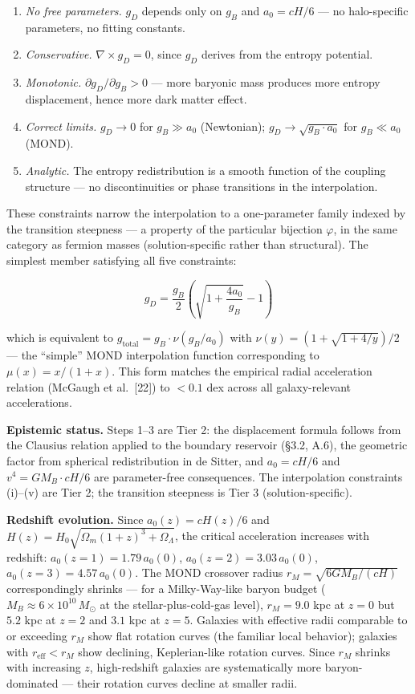 \documentclass[
]{article}
\begin{document}
\begin{enumerate}
\def\labelenumi{(\roman{enumi})}
\item
  \emph{No free parameters.} \(g_D\) depends only on \(g_B\) and
  \(a_0 = cH/6\) --- no halo-specific parameters, no fitting constants.
\item
  \emph{Conservative.} \(\nabla \times g_D = 0\), since \(g_D\) derives
  from the entropy potential.
\item
  \emph{Monotonic.} \(\partial g_D / \partial g_B > 0\) --- more
  baryonic mass produces more entropy displacement, hence more dark
  matter effect.
\item
  \emph{Correct limits.} \(g_D \to 0\) for \(g_B \gg a_0\) (Newtonian);
  \(g_D \to \sqrt{g_B \cdot a_0}\) for \(g_B \ll a_0\) (MOND).
\item
  \emph{Analytic.} The entropy redistribution is a smooth function of
  the coupling structure --- no discontinuities or phase transitions in
  the interpolation.
\end{enumerate}

These constraints narrow the interpolation to a one-parameter family
indexed by the transition steepness --- a property of the particular
bijection \(\varphi\), in the same category as fermion masses
(solution-specific rather than structural). The simplest member
satisfying all five constraints:

\[g_D = \frac{g_B}{2}\left(\sqrt{1 + \frac{4a_0}{g_B}} - 1\right)\]

which is equivalent to \(g_{\text{total}} = g_B \cdot \nu(g_B/a_0)\)
with \(\nu(y) = (1 + \sqrt{1 + 4/y})/2\) --- the ``simple'' MOND
interpolation function corresponding to \(\mu(x) = x/(1+x)\). This form
matches the empirical radial acceleration relation (McGaugh et
al.~{[}22{]}) to \(< 0.1\) dex across all galaxy-relevant accelerations.

\textbf{Epistemic status.} Steps 1--3 are Tier 2: the displacement
formula follows from the Clausius relation applied to the boundary
reservoir (§3.2, A.6), the geometric factor from spherical
redistribution in de Sitter, and \(a_0 = cH/6\) and
\(v^4 = GM_B \cdot cH/6\) are parameter-free consequences. The
interpolation constraints (i)--(v) are Tier 2; the transition steepness
is Tier 3 (solution-specific).

\textbf{Redshift evolution.} Since \(a_0(z) = cH(z)/6\) and
\(H(z) = H_0\sqrt{\Omega_m(1+z)^3 + \Omega_\Lambda}\), the critical
acceleration increases with redshift: \(a_0(z=1) = 1.79\,a_0(0)\),
\(a_0(z=2) = 3.03\,a_0(0)\), \(a_0(z=3) = 4.57\,a_0(0)\). The MOND
crossover radius \(r_M = \sqrt{6GM_B/(cH)}\) correspondingly shrinks ---
for a Milky-Way-like baryon budget
(\(M_B \approx 6 \times 10^{10}\,M_\odot\) at the stellar-plus-cold-gas
level), \(r_M = 9.0\) kpc at \(z = 0\) but \(5.2\) kpc at \(z = 2\) and
\(3.1\) kpc at \(z = 5\). Galaxies with effective radii comparable to or
exceeding \(r_M\) show flat rotation curves (the familiar local
behavior); galaxies with \(r_{\text{eff}} < r_M\) show declining,
Keplerian-like rotation curves. Since \(r_M\) shrinks with increasing
\(z\), high-redshift galaxies are systematically more baryon-dominated
--- their rotation curves decline at smaller radii.
\end{document}
